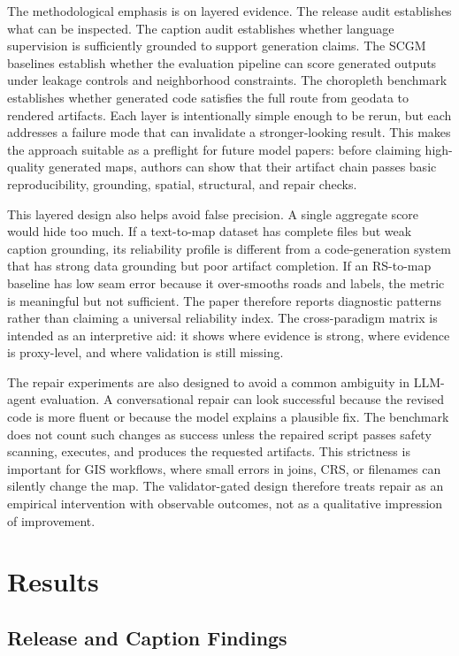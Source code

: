 \documentclass[]{interact}
\begin{document}
The methodological emphasis is on layered evidence. The release audit establishes what can be inspected. The caption audit establishes whether language supervision is sufficiently grounded to support generation claims. The SCGM baselines establish whether the evaluation pipeline can score generated outputs under leakage controls and neighborhood constraints. The choropleth benchmark establishes whether generated code satisfies the full route from geodata to rendered artifacts. Each layer is intentionally simple enough to be rerun, but each addresses a failure mode that can invalidate a stronger-looking result. This makes the approach suitable as a preflight for future model papers: before claiming high-quality generated maps, authors can show that their artifact chain passes basic reproducibility, grounding, spatial, structural, and repair checks.

This layered design also helps avoid false precision. A single aggregate score would hide too much. If a text-to-map dataset has complete files but weak caption grounding, its reliability profile is different from a code-generation system that has strong data grounding but poor artifact completion. If an RS-to-map baseline has low seam error because it over-smooths roads and labels, the metric is meaningful but not sufficient. The paper therefore reports diagnostic patterns rather than claiming a universal reliability index. The cross-paradigm matrix is intended as an interpretive aid: it shows where evidence is strong, where evidence is proxy-level, and where validation is still missing.

The repair experiments are also designed to avoid a common ambiguity in LLM-agent evaluation. A conversational repair can look successful because the revised code is more fluent or because the model explains a plausible fix. The benchmark does not count such changes as success unless the repaired script passes safety scanning, executes, and produces the requested artifacts. This strictness is important for GIS workflows, where small errors in joins, CRS, or filenames can silently change the map. The validator-gated design therefore treats repair as an empirical intervention with observable outcomes, not as a qualitative impression of improvement.

\section{Results}

\subsection{Release and Caption Findings}
\end{document}
